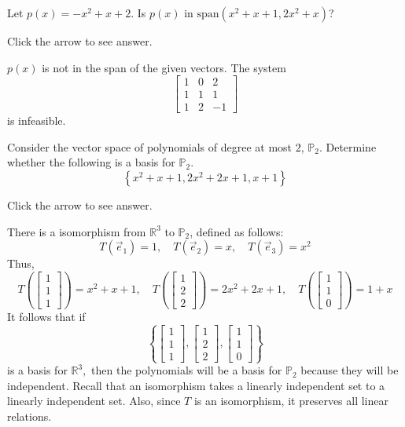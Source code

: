 \documentclass{ximera}
\begin{document}
\begin{problem}\label{prb:10.25} Let $p(x) = - x^2 + x + 2 $. Is $p(x)$ in $\mbox{span} \left( x^2 + x + 1, 2x^2 + x \right)$?

Click the arrow to see answer.
\begin{expandable}
    $p(x)$ is not in the span of the given vectors.  The system 
    $$\left[
\begin{array}{rr|r}
1 & 0 & 2 \\
1 & 1 & 1\\
1 & 2 & -1
\end{array}
\right]$$
is infeasible.
\end{expandable}
\end{problem}

\begin{problem}\label{prb:10.28} Consider the vector space of polynomials of degree at most $2$, $\mathbb{P}_{2}$. Determine whether the following is a basis for $\mathbb{P}_{2}$.
\begin{equation*}
\left\{ x^{2}+x+1,2x^{2}+2x+1,x+1\right\}
\end{equation*}

Click the arrow to see answer.
\begin{expandable}
There is a isomorphism from $\mathbb{R}^{3}$ to $\mathbb{P}
_{2}$, defined as follows:
$$
T(\vec{e}_{1})=1,\quad T(\vec{e}_{2})=x,\quad T(\vec{e}_{3})=x^{2}
$$
Thus,
$$
T\left(\left[
\begin{array}{c}
1 \\
1 \\
1
\end{array}
\right]\right) =x^{2}+x+1,\quad T\left(\left[
\begin{array}{c}
1 \\
2 \\
2
\end{array}
\right]\right) =2x^{2}+2x+1,\quad T\left(\left[
\begin{array}{c}
1 \\
1 \\
0
\end{array}
\right]\right) =1+x
$$
It follows that if
$$
\left\{ \left[
\begin{array}{c}
1 \\
1 \\
1
\end{array}
\right] ,\left[
\begin{array}{c}
1 \\
2 \\
2
\end{array}
\right] ,\left[
\begin{array}{c}
1 \\
1 \\
0
\end{array}
\right] \right\}
$$
is a basis for $\mathbb{R}^{3},$ then the polynomials will be a basis for $
\mathbb{P}_{2}$ because they will be independent. Recall that an isomorphism
takes a linearly independent set to a linearly independent set. Also, since $
T$ is an isomorphism, it preserves all linear relations.
\end{expandable}
\end{problem}
\end{document}

